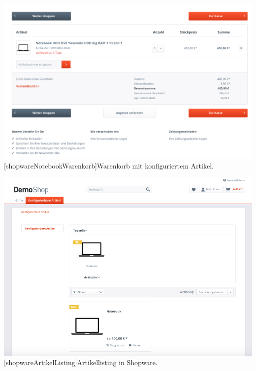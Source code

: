 \begin{appendix}
\vspace{1em}
\begin{minipage}{\linewidth}
	\centering
	\includegraphics[width=1\linewidth]{Abbildungen/shopwareNotebookWarenkorb.png}
	[shopwareNotebookWarenkorb]{Warenkorb mit konfiguriertem Artikel.}
	\label{app:shopwareNotebookWarenkorb}
\end{minipage}
\vspace{1em}

\vspace{1em}
\begin{minipage}{\linewidth}
	\centering
	\includegraphics[width=1\linewidth]{Abbildungen/shopwareArtikelListing.png}
	[shopwareArtikelListing]{Artikellisting in Shopware.}
	\label{app:shopwareArtikelListing}
\end{minipage}
\vspace{1em}


\end{appendix}
